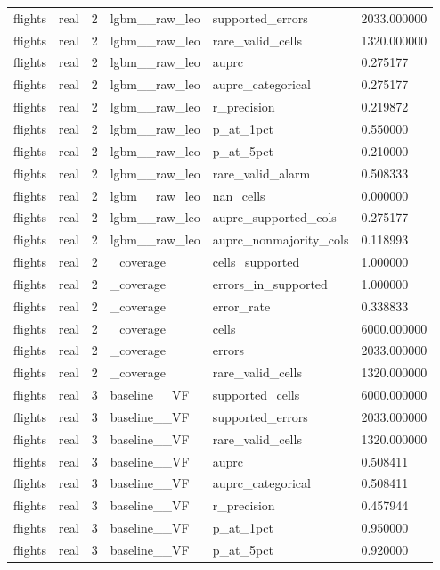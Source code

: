 \begin{tabular}{llllll}
flights & real & 2 & lgbm\_\_raw\_leo & supported\_errors & 2033.000000 \\
flights & real & 2 & lgbm\_\_raw\_leo & rare\_valid\_cells & 1320.000000 \\
flights & real & 2 & lgbm\_\_raw\_leo & auprc & 0.275177 \\
flights & real & 2 & lgbm\_\_raw\_leo & auprc\_categorical & 0.275177 \\
flights & real & 2 & lgbm\_\_raw\_leo & r\_precision & 0.219872 \\
flights & real & 2 & lgbm\_\_raw\_leo & p\_at\_1pct & 0.550000 \\
flights & real & 2 & lgbm\_\_raw\_leo & p\_at\_5pct & 0.210000 \\
flights & real & 2 & lgbm\_\_raw\_leo & rare\_valid\_alarm & 0.508333 \\
flights & real & 2 & lgbm\_\_raw\_leo & nan\_cells & 0.000000 \\
flights & real & 2 & lgbm\_\_raw\_leo & auprc\_supported\_cols & 0.275177 \\
flights & real & 2 & lgbm\_\_raw\_leo & auprc\_nonmajority\_cols & 0.118993 \\
flights & real & 2 & \_coverage & cells\_supported & 1.000000 \\
flights & real & 2 & \_coverage & errors\_in\_supported & 1.000000 \\
flights & real & 2 & \_coverage & error\_rate & 0.338833 \\
flights & real & 2 & \_coverage & cells & 6000.000000 \\
flights & real & 2 & \_coverage & errors & 2033.000000 \\
flights & real & 2 & \_coverage & rare\_valid\_cells & 1320.000000 \\
flights & real & 3 & baseline\_\_VF & supported\_cells & 6000.000000 \\
flights & real & 3 & baseline\_\_VF & supported\_errors & 2033.000000 \\
flights & real & 3 & baseline\_\_VF & rare\_valid\_cells & 1320.000000 \\
flights & real & 3 & baseline\_\_VF & auprc & 0.508411 \\
flights & real & 3 & baseline\_\_VF & auprc\_categorical & 0.508411 \\
flights & real & 3 & baseline\_\_VF & r\_precision & 0.457944 \\
flights & real & 3 & baseline\_\_VF & p\_at\_1pct & 0.950000 \\
flights & real & 3 & baseline\_\_VF & p\_at\_5pct & 0.920000 \\

\end{tabular}
